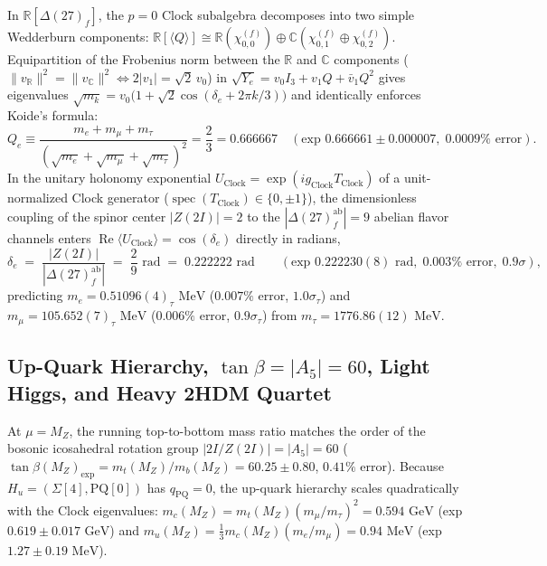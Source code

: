 \documentclass[11pt,a4paper]{article}
\theoremstyle{definition}
\theoremstyle{remark}
\newcommand{\R}{\mathbb{R}}
\newcommand{\C}{\mathbb{C}}
\begin{document}
In $\R[\Delta(27)_f]$, the $p = 0$ Clock subalgebra decomposes into two simple Wedderburn components: $\R[\langle Q \rangle] \cong \R(\chi_{0,0}^{(f)}) \oplus \C(\chi_{0,1}^{(f)} \oplus \chi_{0,2}^{(f)})$. Equipartition of the Frobenius norm between the $\R$ and $\C$ components ($\|v_\R\|^2 = \|v_\C\|^2 \iff 2|v_1| = \sqrt{2}\,v_0$) in $\sqrt{Y_e} = v_0 I_3 + v_1 Q + \bar{v}_1 Q^2$ gives eigenvalues $\sqrt{m_k} = v_0\bigl(1 + \sqrt{2}\cos(\delta_e + 2\pi k/3)\bigr)$ and identically enforces Koide's formula:
\begin{equation}
\label{eq:koide}
Q_e \equiv \frac{m_e + m_\mu + m_\tau}{(\sqrt{m_e} + \sqrt{m_\mu} + \sqrt{m_\tau})^2} = \frac{2}{3} = 0.666667 \quad (\text{exp } 0.666661 \pm 0.000007,\; 0.0009\%\text{ error}).
\end{equation}
In the unitary holonomy exponential $U_{\mathrm{Clock}} = \exp(i g_{\mathrm{Clock}} T_{\mathrm{Clock}})$ of a unit-normalized Clock generator ($\operatorname{spec}(T_{\mathrm{Clock}}) \in \{0, \pm 1\}$), the dimensionless coupling of the spinor center $|Z(2I)| = 2$ to the $|\Delta(27)_f^{\mathrm{ab}}| = 9$ abelian flavor channels enters $\operatorname{Re}\langle U_{\mathrm{Clock}}\rangle = \cos(\delta_e)$ directly in radians,
\begin{equation}
\label{eq:brannen_phase}
\delta_e \;=\; \frac{|Z(2I)|}{|\Delta(27)_f^{\mathrm{ab}}|} \;=\; \frac{2}{9}\text{ rad} \;=\; 0.222222\text{ rad} \qquad (\text{exp } 0.222230(8)\text{ rad},\; 0.003\%\text{ error},\; 0.9\sigma),
\end{equation}
predicting $m_e = 0.51096(4)_\tau\text{ MeV}$ ($0.007\%$ error, $1.0\sigma_\tau$) and $m_\mu = 105.652(7)_\tau\text{ MeV}$ ($0.006\%$ error, $0.9\sigma_\tau$) from $m_\tau = 1776.86(12)\text{ MeV}$.

\subsection{Up-Quark Hierarchy, $\tan\beta = |A_5| = 60$, Light Higgs, and Heavy 2HDM Quartet}

At $\mu = M_Z$, the running top-to-bottom mass ratio matches the order of the bosonic icosahedral rotation group $|2I / Z(2I)| = |A_5| = 60$ ($\tan\beta(M_Z)_{\mathrm{exp}} = m_t(M_Z)/m_b(M_Z) = 60.25 \pm 0.80$, $0.41\%$ error). Because $H_u = (\Sigma[4], \mathrm{PQ}[0])$ has $q_{\mathrm{PQ}} = 0$, the up-quark hierarchy scales quadratically with the Clock eigenvalues: $m_c(M_Z) = m_t(M_Z)(m_\mu/m_\tau)^2 = 0.594\text{ GeV}$ (exp $0.619 \pm 0.017\text{ GeV}$) and $m_u(M_Z) = \frac{1}{3}m_c(M_Z)(m_e/m_\mu) = 0.94\text{ MeV}$ (exp $1.27 \pm 0.19\text{ MeV}$).
\end{document}
